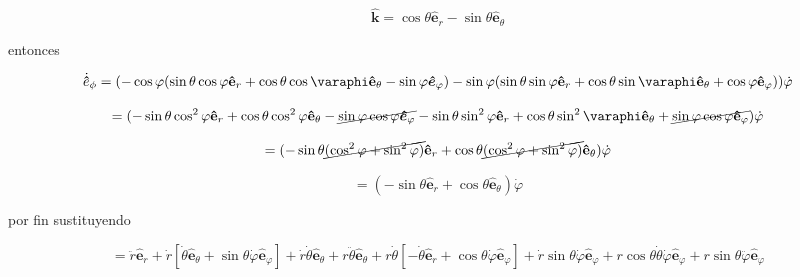 \documentclass[12pt,a4paper]{article}
\begin{document}
\begin{enumerate}
      \begin{equation*}
          \boldsymbol{\hat{k}} = \cos{\theta} \mathbf{\hat{e}}_r - \sin{\theta} \mathbf{\hat{e}}_\theta
      \end{equation*}
      
      entonces
      
      \begin{equation*}
          \dot{\mathbf{\hat{e}}}_\phi = (-\cos{\varphi}  (\sin{\theta} \cos{\varphi} \mathbf{\hat{e}}_r + \cos{\theta} \cos{\varaphi} \mathbf{\hat{e}}_\theta - \sin{\varphi}\boldsymbol{\hat{e}}_\varphi) - \sin{\varphi} (\sin{\theta} \sin{\varphi} \mathbf{\hat{e}}_r + \cos{\theta} \sin{\varaphi} \mathbf{\hat{e}}_\theta + \cos{\varphi} \mathbf{\hat{e}}_\varphi)) \dot{\varphi}
      \end{equation*}
      
      \begin{equation*}
          = (-\sin{\theta} \cos^2{\varphi} \mathbf{\hat{e}}_r + \cos{\theta} \cos^2{\varphi} \mathbf{\hat{e}}_\theta - \cancel{\sin{\varphi} \cos{\varphi}\boldsymbol{\hat{e}}_\varphi} - \sin{\theta} \sin^2{\varphi} \mathbf{\hat{e}}_r + \cos{\theta} \sin^2{\varaphi} \mathbf{\hat{e}}_\theta +\cancel{\sin{\varphi} \cos{\varphi} \mathbf{\hat{e}}_\varphi}) \dot{\varphi}
      \end{equation*}
      
      \begin{equation*}
          = (-\sin{\theta} \cancel{(\cos^2{\varphi} + \sin^2{\varphi})} \mathbf{\hat{e}}_r + \cos{\theta} \cancel{(\cos^2{\varphi} + \sin^2{\varphi})} \mathbf{\hat{e}}_\theta) \dot{\varphi}
      \end{equation*}
      
      \begin{equation*}
          = (-\sin{\theta}  \mathbf{\hat{e}}_r + \cos{\theta} \mathbf{\hat{e}}_\theta) \dot{\varphi}
      \end{equation*}
      
      
      por fin sustituyendo
      
      \begin{equation*}
          = \ddot{r}\mathbf{\hat{e}}_r + \dot{r}[\dot{\theta} \hat{\mathbf{e}}_\theta + \sin{\theta} \dot{\varphi} \hat{\mathbf{e}}_\varphi] + \dot{r} \dot{\theta} \mathbf{\hat{e}}_\theta + r \ddot{\theta} \mathbf{\hat{e}}_\theta + r \dot{\theta} [- \dot{\theta} \hat{\mathbf{e}}_r + \cos{\theta} \dot{\varphi} \hat{\mathbf{e}}_\varphi] + \dot{r}\sin{\theta}\dot{\varphi}\mathbf{\hat{e}}_\varphi+ r \cos{\theta} \dot{\theta} \dot{\varphi} \mathbf{\hat{e}}_\varphi + r \sin{\theta} \ddot{\varphi} \mathbf{\hat{e}}_\varphi 
      \end{equation*}
      

\end{enumerate}
\end{document}
